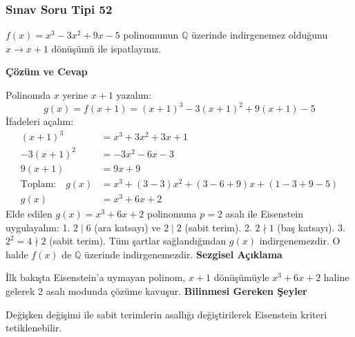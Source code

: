 \documentclass[11pt, a4paper]{article}
\newenvironment{cozum}{
    \vspace{0.5cm}
    \noindent\textcolor{green!60!black}{\faCheckCircle\enspace \textbf{\Large Çözüm ve Cevap}}\par\vspace{0.2cm}
}{}
\newenvironment{sezgisel}{
    \vspace{0.5cm}
    \noindent\textcolor{orange!80!black}{\faLightbulb\enspace \textbf{\Large Sezgisel Açıklama}}\par\vspace{0.2cm}
    \itshape
}{}
\newenvironment{bilgi}{
    \vspace{0.5cm}
    \noindent\textcolor{red!70!black}{\faExclamationTriangle\enspace \textbf{\Large Bilinmesi Gereken Şeyler}}\par\vspace{0.2cm}
}{}
\begin{document}
\subsubsection{Sınav Soru Tipi 52}
\begin{sinavbox}
$f(x) = x^3-3x^2+9x-5$ polinomunun $\mathbb{Q}$ üzerinde indirgenemez olduğunu $x \to x+1$ dönüşümü ile ispatlayınız.
\end{sinavbox}
\begin{cozum}
Polinomda $x$ yerine $x+1$ yazalım:
\[ g(x) = f(x+1) = (x+1)^3 - 3(x+1)^2 + 9(x+1) - 5 \]
İfadeleri açalım:
\begin{align*}
(x+1)^3 &= x^3 + 3x^2 + 3x + 1 \\
-3(x+1)^2 &= -3x^2 - 6x - 3 \\
9(x+1) &= 9x + 9 \\
\text{Toplam:} \quad g(x) &= x^3 + (3-3)x^2 + (3-6+9)x + (1-3+9-5) \\
g(x) &= x^3 + 6x + 2
\end{align*}
Elde edilen $g(x) = x^3+6x+2$ polinomuna $p=2$ asalı ile Eisenstein uygulayalım:
1. $2 \mid 6$ (ara katsayı) ve $2 \mid 2$ (sabit terim).
2. $2 \nmid 1$ (baş katsayı).
3. $2^2 = 4 \nmid 2$ (sabit terim).
Tüm şartlar sağlandığından $g(x)$ indirgenemezdir. O halde $f(x)$ de $\mathbb{Q}$ üzerinde indirgenemezdir.
\end{cozum}
\begin{sezgisel}
İlk bakışta Eisenstein'a uymayan polinom, $x+1$ dönüşümüyle $x^3+6x+2$ haline gelerek 2 asalı modunda çözüme kavuşur.
\end{sezgisel}
\begin{bilgi}
Değişken değişimi ile sabit terimlerin asallığı değiştirilerek Eisenstein kriteri tetiklenebilir.
\end{bilgi}

\newpage
\end{document}
